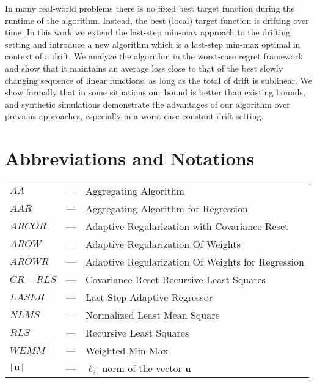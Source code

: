 \documentclass[MSc]{iitcsthesis}
\begin{document}
In many real-world problems there is no fixed best target function during the runtime of the algorithm. Instead, the best (local) target function is drifting over time. In this work we extend the last-step min-max approach to the drifting setting and introduce a new algorithm which is a last-step min-max optimal in context of a drift. We analyze the algorithm in the worst-case regret framework and show that it maintains an average loss close to that of the best slowly changing sequence of linear functions, as long as the total of drift is sublinear. We show formally that in some situations our bound is better than existing bounds, and
synthetic simulations demonstrate the advantages of our algorithm over previous approaches, especially in a worst-case constant drift setting.



\chapter*{Abbreviations and Notations}
\begin{tabular}{lcl}
$AA$ & --- & Aggregating Algorithm\\
$AAR$ & --- & Aggregating Algorithm for Regression\\
$ARCOR$ & --- & Adaptive Regularization with Covariance Reset\\
$AROW$ & --- & Adaptive Regularization Of Weights\\
$AROWR$ & --- & Adaptive Regularization Of Weights for Regression\\
$CR-RLS$ & --- & Covariance Reset Recursive Least Squares\\
$LASER$ & --- & Last-Step Adaptive Regressor\\
$NLMS$ & --- & Normalized Least Mean Square\\
$RLS$ & --- & Recursive Least Squares\\
$WEMM$ & --- & Weighted Min-Max\\
$\Vert\mathbf{u} \Vert$ & --- & $\ell_2$-norm of the vector $\mathbf{u}$\\
\end{tabular}

\end{document}
